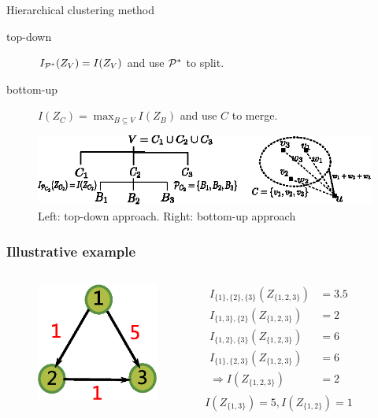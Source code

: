 \documentclass[notheorems]{beamer}
\begin{document}
\begin{frame}{Hierarchical clustering method}
\begin{description}
\item[top-down] $I_{\P^*}(Z_V)=I(Z_V)$ and use $\P^*$ to split.
\item[bottom-up] $I(Z_C) = \max_{B\subseteq V} I(Z_B)$ and use $C$ to merge.
\end{description}
\begin{figure}
\centering
\includegraphics[width=\textwidth]{pic/two_approach.eps}
\caption{Left: top-down approach. Right: bottom-up approach}
\end{figure}
\end{frame}
\begin{frame}
	\frametitle{Illustrative example}
	\begin{columns}
		\column{5cm}
		\begin{figure}
			\includegraphics[width=4cm]{pic/example_directed.eps}
		\end{figure}
		\column{5cm}
		\begin{align*}
			I_{\{1\},\{2\},\{3\}}(Z_{\{1,2,3\}}) & = 3.5 \\
			I_{\{1,3\},\{2\}}(Z_{\{1,2,3\}}) & = 2 \\ 
			I_{\{1,2\},\{3\}}(Z_{\{1,2,3\}}) & = 6 \\ 
			I_{\{1\},\{2,3\}}(Z_{\{1,2,3\}}) & = 6 \\ 
			\Rightarrow I(Z_{\{1,2,3\}}) & = 2 \\
		\end{align*}
		\begin{equation*}
			I(Z_{\{1,3\}}) = 5, I(Z_{\{1,2\}}) = 1
		\end{equation*}
	\end{columns}
\end{frame}
\end{document}
